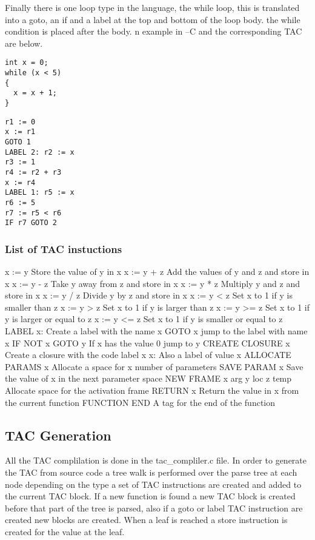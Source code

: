 \documentclass{article}
\begin{document}
Finally there is one loop type in the language, the while loop, this is translated
into a goto, an if and a label at the top and bottom of the loop body. the while
condition is placed after the body. n example in --C and the corresponding TAC
are below.

\begin{lstlisting}
int x = 0;
while (x < 5)
{
  x = x + 1;
}
\end{lstlisting}

\begin{lstlisting}
r1 := 0
x := r1
GOTO 1
LABEL 2: r2 := x
r3 := 1
r4 := r2 + r3
x := r4
LABEL 1: r5 := x
r6 := 5
r7 := r5 < r6
IF r7 GOTO 2
\end{lstlisting}

\subsubsection{List of TAC instuctions}
x := y                            Store the value of y in x
x := y + z                        Add the values of y and z and store in x
x := y - z                        Take y away from z and store in x
x := y * z                        Multiply y and z and store in x
x := y / z                        Divide y by z and store in x
x := y < z                        Set x to 1 if y is smaller than z
x := y > z                        Set x to 1 if y is larger than z
x := y >= z                       Set x to 1 if y is larger or equal to z
x := y <= z                       Set x to 1 if y is smaller or equal to z
LABEL x:                          Create a label with the name x
GOTO x                            jump to the label with name x
IF NOT x GOTO y                   If x has the value 0 jump to y
CREATE CLOSURE x                  Create a closure with the code label x
x:                                Also a label of value x
ALLOCATE PARAMS x                 Allocate a space for x number of parameters
SAVE PARAM x                      Save the value of x in the next parameter space
NEW FRAME x arg y loc z temp      Allocate space for the activation frame
RETURN x                          Return the value in x from the current function
FUNCTION END                      A tag for the end of the function

\subsection{TAC Generation}

All the TAC complilation is done in the tac\_compliler.c file.
In order to generate the TAC from source code a tree walk is performed over the
parse tree at each node depending on the type a set of TAC instructions are created
and added to the current TAC block. If a new function is found a new TAC block is
created before that part of the tree is parsed, also if a goto or label TAC instruction
are created new blocks are created. When a leaf is reached a store instruction is
created for the value at the leaf.\\~\\
\end{document}
